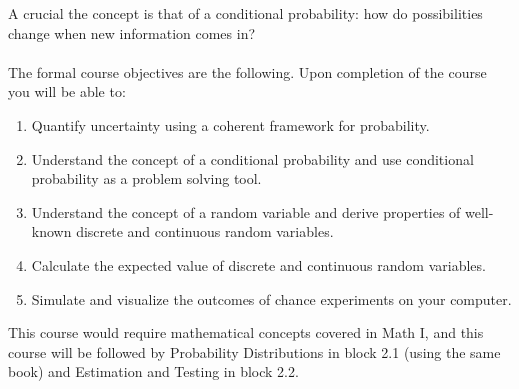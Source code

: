 \documentclass[openany]{article}
\begin{document}
A crucial
the concept is that of a conditional probability: how do possibilities change
when new information comes in?\\~\\
The formal course objectives are the following. Upon completion of the
course you will be able to:
\begin{enumerate}
	\item Quantify uncertainty using a coherent framework for probability.
	\item Understand the concept of a conditional probability and use conditional
	probability as a problem solving tool.
	\item Understand the concept of a random variable and derive properties of
	well-known discrete and continuous random variables.
	\item Calculate the expected value of discrete and continuous random variables.
	\item Simulate and visualize the outcomes of chance experiments on your
	computer.
\end{enumerate}
This course would require mathematical concepts covered in Math I, and this course will be followed by Probability Distributions in block 2.1 (using
the same book) and Estimation and Testing in block 2.2. 
\end{document}
